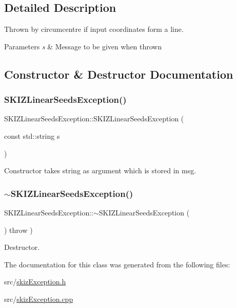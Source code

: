 \subsection{Detailed Description}
Thrown by circumcentre if input coordinates form a line. 


\begin{DoxyParams}{Parameters}
{\em s} & Message to be given when thrown \\
\hline
\end{DoxyParams}


\subsection{Constructor \& Destructor Documentation}
\mbox{\label{classSKIZLinearSeedsException_a11607556ca04d52a2d2c35c06fad3f6b}} 
\subsubsection{\texorpdfstring{S\+K\+I\+Z\+Linear\+Seeds\+Exception()}{SKIZLinearSeedsException()}}
{\footnotesize\ttfamily S\+K\+I\+Z\+Linear\+Seeds\+Exception\+::\+S\+K\+I\+Z\+Linear\+Seeds\+Exception (\begin{DoxyParamCaption}\item[{const std\+::string}]{s }\end{DoxyParamCaption})}



Constructor takes string as argument which is stored in msg. 

\mbox{\label{classSKIZLinearSeedsException_a8482d8d51517e183205757fd4855107b}} 
\subsubsection{\texorpdfstring{$\sim$\+S\+K\+I\+Z\+Linear\+Seeds\+Exception()}{~SKIZLinearSeedsException()}}
{\footnotesize\ttfamily S\+K\+I\+Z\+Linear\+Seeds\+Exception\+::$\sim$\+S\+K\+I\+Z\+Linear\+Seeds\+Exception (\begin{DoxyParamCaption}{ }\end{DoxyParamCaption}) throw  ) \hspace{0.3cm}{\ttfamily [virtual]}}



Destructor. 



The documentation for this class was generated from the following files\+:\begin{DoxyCompactItemize}
\item 
src/\mbox{\hyperlink{skizException_8h}{skiz\+Exception.\+h}}\item 
src/\mbox{\hyperlink{skizException_8cpp}{skiz\+Exception.\+cpp}}\end{DoxyCompactItemize}
